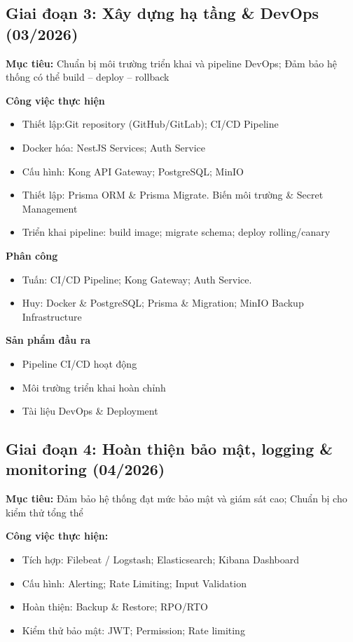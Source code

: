\subsection{Giai đoạn 3: Xây dựng hạ tầng \& DevOps (03/2026)}

\textbf{Mục tiêu:} Chuẩn bị môi trường triển khai và pipeline DevOps; Đảm bảo hệ thống có thể build – deploy – rollback

\textbf{Công việc thực hiện}

\begin{itemize}
    \item Thiết lập:Git repository (GitHub/GitLab); CI/CD Pipeline
    \item Docker hóa: NestJS Services; Auth Service
    \item Cấu hình: Kong API Gateway; PostgreSQL; MinIO
    \item Thiết lập: Prisma ORM \& Prisma Migrate. Biến môi trường \& Secret Management
    \item  Triển khai pipeline: build image; migrate schema; deploy rolling/canary
\end{itemize}

\textbf{Phân công}

\begin{itemize}
    \item Tuấn: CI/CD Pipeline; Kong Gateway; Auth Service.
    \item Huy: Docker \& PostgreSQL; Prisma \& Migration; MinIO Backup Infrastructure
\end{itemize}

\textbf{Sản phẩm đầu ra}

\begin{itemize}
    \item Pipeline CI/CD hoạt động
    \item Môi trường triển khai hoàn chỉnh
    \item Tài liệu DevOps \& Deployment
\end{itemize}

\subsection{Giai đoạn 4: Hoàn thiện bảo mật, logging \& monitoring (04/2026)}

\textbf{Mục tiêu:} Đảm bảo hệ thống đạt mức bảo mật và giám sát cao; Chuẩn bị cho kiểm thử tổng thể

\textbf{Công việc thực hiện:}

\begin{itemize}
    \item Tích hợp: Filebeat / Logstash; Elasticsearch; Kibana Dashboard
    \item Cấu hình: Alerting; Rate Limiting; Input Validation
    \item Hoàn thiện: Backup \& Restore; RPO/RTO
    \item Kiểm thử bảo mật: JWT; Permission; Rate limiting
\end{itemize}

